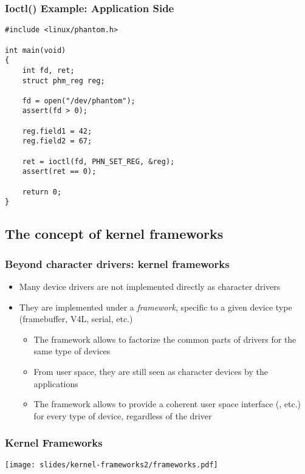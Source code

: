 \begin{frame}[fragile]
  \frametitle{Ioctl() Example: Application Side}
\begin{verbatim}
#include <linux/phantom.h>

int main(void)
{
    int fd, ret;
    struct phm_reg reg;

    fd = open("/dev/phantom");
    assert(fd > 0);

    reg.field1 = 42;
    reg.field2 = 67;

    ret = ioctl(fd, PHN_SET_REG, &reg);
    assert(ret == 0);

    return 0;
}
\end{verbatim}
\end{frame}

\subsection{The concept of kernel frameworks}

\begin{frame}
  \frametitle{Beyond character drivers: kernel frameworks}
  \begin{itemize}
  \item Many device drivers are not implemented directly as character
    drivers
  \item They are implemented under a \emph{framework}, specific to a
    given device type (framebuffer, V4L, serial, etc.)
    \begin{itemize}
    \item The framework allows to factorize the common parts of
      drivers for the same type of devices
    \item From user space, they are still seen as character devices by
      the applications
    \item The framework allows to provide a coherent user space
      interface (, etc.) for every type of device,
      regardless of the driver
    \end{itemize}
  \end{itemize}
\end{frame}

\begin{frame}
  \frametitle{Kernel Frameworks}
  \begin{center}
    \texttt{[image: slides/kernel-frameworks2/frameworks.pdf]}
  \end{center}
\end{frame}

